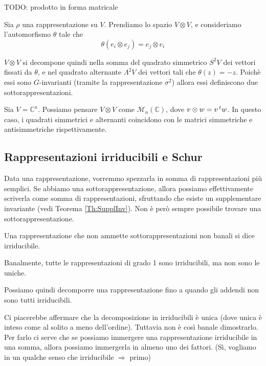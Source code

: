 \documentclass[a4paper,10pt,oneside]{math_article}
\newcommand{\tensor}{\otimes}
\begin{document}
    TODO: prodotto in forma matricale
    
    \begin{mydef}
     Sia $\rho$ una rappresentazione su $V$. Prendiamo lo spazio $V\otimes V$, e consideriamo l'automorfismo $\theta$ tale che 
     \[
      \theta(e_i \tensor e_j) = e_j \tensor e_i
     \]
     
     $V\otimes V$ si decompone quindi nella somma del quadrato simmetrico $S^2V$ dei vettori fissati da $\theta$, e nel quadrato alternante $\Lambda^2V$ dei vettori tali che $\theta(z) = -z$. Poichè essi sono $G$-invarianti (tramite la rappresentazione $\sigma^2$) allora essi definiscono due sottorappresentazioni.
    \end{mydef}
    \begin{myexample}
     Sia $V=\mathbb C^n$. Possiamo pensare $V\otimes V$ come $\mathcal M_n(\mathbb C)$, dove $v \tensor w = v\trasp w$. In questo caso, i quadrati simmetrici e alternanti coincidono con le matrici simmetriche e antisimmetriche rispettivamente.
    \end{myexample}


  
  \subsection{Rappresentazioni irriducibili e Schur}
    Data una rappresentazione, vorremmo spezzarla in somma di rappresentazioni più semplici. Se abbiamo una sottorappresentazione, allora possiamo effettivamente scriverla come somma di rappresentazioni, sfruttando che esiste un supplementare invariante (vedi Teorema \ref{Th:SupplInv}). Non è però sempre possibile trovare una sottorappresentazione.
    \begin{mydef}
      Una rappresentazione che non ammette sottorappresentazioni non banali si dice irriducibile.
    \end{mydef}
    
    Banalmente, tutte le rappresentazioni di grado 1 sono irriducibili, ma non sono le uniche.
    
    
    Possiamo quindi decomporre una rappresentazione fino a quando gli addendi non sono tutti irriducibili.
    
    Ci piacerebbe affermare che la decomposizione in irriducibili è unica (dove unica è inteso come al solito a meno dell'ordine). Tuttavia non è così banale dimostrarlo. Per farlo ci serve che se possiamo immergere una rappresentazione irriducibile in una somma, allora possiamo immergerla in almeno uno dei fattori. (Sì, vogliamo in un qualche senso che irriducibile $\Rightarrow$ primo)
    
\end{document}
